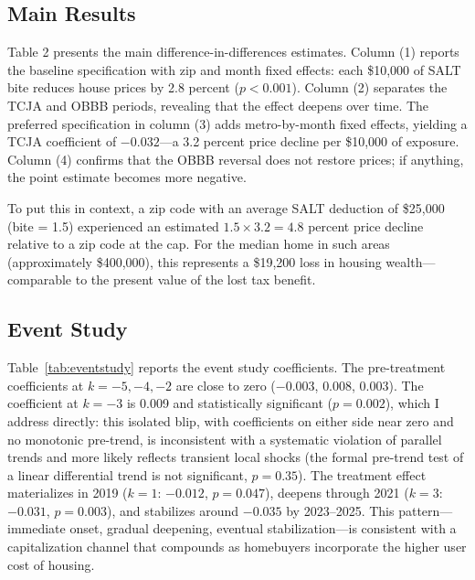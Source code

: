 \documentclass[12pt]{article}
\begin{document}
\subsection{Main Results}



Table 2 presents the main difference-in-differences estimates. Column (1) reports the baseline specification with zip and month fixed effects: each \$10,000 of SALT bite reduces house prices by 2.8 percent ($p < 0.001$). Column (2) separates the TCJA and OBBB periods, revealing that the effect deepens over time. The preferred specification in column (3) adds metro-by-month fixed effects, yielding a TCJA coefficient of $-0.032$---a 3.2 percent price decline per \$10,000 of exposure. Column (4) confirms that the OBBB reversal does not restore prices; if anything, the point estimate becomes more negative.

To put this in context, a zip code with an average SALT deduction of \$25,000 (bite = 1.5) experienced an estimated $1.5 \times 3.2 = 4.8$ percent price decline relative to a zip code at the cap. For the median home in such areas (approximately \$400,000), this represents a \$19,200 loss in housing wealth---comparable to the present value of the lost tax benefit.

\subsection{Event Study}



Table~\ref{tab:eventstudy} reports the event study coefficients. The pre-treatment coefficients at $k = -5, -4, -2$ are close to zero ($-0.003$, $0.008$, $0.003$). The coefficient at $k = -3$ is 0.009 and statistically significant ($p = 0.002$), which I address directly: this isolated blip, with coefficients on either side near zero and no monotonic pre-trend, is inconsistent with a systematic violation of parallel trends and more likely reflects transient local shocks (the formal pre-trend test of a linear differential trend is not significant, $p = 0.35$). The treatment effect materializes in 2019 ($k = 1$: $-0.012$, $p = 0.047$), deepens through 2021 ($k = 3$: $-0.031$, $p = 0.003$), and stabilizes around $-0.035$ by 2023--2025. This pattern---immediate onset, gradual deepening, eventual stabilization---is consistent with a capitalization channel that compounds as homebuyers incorporate the higher user cost of housing.
\end{document}
